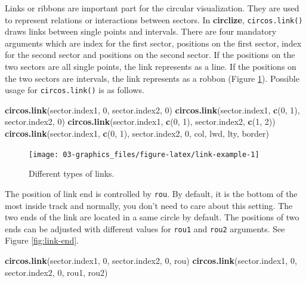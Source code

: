 \documentclass[]{book}
\newenvironment{Shaded}{\begin{snugshade}}{\end{snugshade}}
\newcommand{\KeywordTok}[1]{\textcolor[rgb]{0.13,0.29,0.53}{\textbf{#1}}}
\newcommand{\DecValTok}[1]{\textcolor[rgb]{0.00,0.00,0.81}{#1}}
\newcommand{\NormalTok}[1]{#1}
\theoremstyle{definition}
\theoremstyle{definition}
\theoremstyle{remark}
\begin{document}
Links or ribbons are important part for the circular visualization. They
are used to represent relations or interactions between sectors. In
\textbf{circlize}, \texttt{circos.link()} draws links between single
points and intervals. There are four mandatory arguments which are index
for the first sector, positions on the first sector, index for the
second sector and positions on the second sector. If the positions on
the two sectors are all single points, the link represents as a line. If
the positions on the two sectors are intervals, the link represents as a
robbon (Figure \ref{fig:link-example}). Possible usage for
\texttt{circos.link()} is as follows.

\begin{Shaded}
\begin{Highlighting}[]
\KeywordTok{circos.link}\NormalTok{(sector.index1, }\DecValTok{0}\NormalTok{, sector.index2, }\DecValTok{0}\NormalTok{)}
\KeywordTok{circos.link}\NormalTok{(sector.index1, }\KeywordTok{c}\NormalTok{(}\DecValTok{0}\NormalTok{, }\DecValTok{1}\NormalTok{), sector.index2, }\DecValTok{0}\NormalTok{)}
\KeywordTok{circos.link}\NormalTok{(sector.index1, }\KeywordTok{c}\NormalTok{(}\DecValTok{0}\NormalTok{, }\DecValTok{1}\NormalTok{), sector.index2, }\KeywordTok{c}\NormalTok{(}\DecValTok{1}\NormalTok{, }\DecValTok{2}\NormalTok{))}
\KeywordTok{circos.link}\NormalTok{(sector.index1, }\KeywordTok{c}\NormalTok{(}\DecValTok{0}\NormalTok{, }\DecValTok{1}\NormalTok{), sector.index2, }\DecValTok{0}\NormalTok{, col, lwd, lty, border)}
\end{Highlighting}
\end{Shaded}

\begin{figure}

{\centering \texttt{[image: 03-graphics\_files/figure-latex/link-example-1]} 

}

\caption{Different types of links.}\label{fig:link-example}
\end{figure}

The position of link end is controlled by \texttt{rou}. By default, it
is the bottom of the most inside track and normally, you don't need to
care about this setting. The two ends of the link are located in a same
circle by default. The positions of two ends can be adjusted with
different values for \texttt{rou1} and \texttt{rou2} arguments. See
Figure \ref{fig:link-end}.

\begin{Shaded}
\begin{Highlighting}[]
\KeywordTok{circos.link}\NormalTok{(sector.index1, }\DecValTok{0}\NormalTok{, sector.index2, }\DecValTok{0}\NormalTok{, rou)}
\KeywordTok{circos.link}\NormalTok{(sector.index1, }\DecValTok{0}\NormalTok{, sector.index2, }\DecValTok{0}\NormalTok{, rou1, rou2)}
\end{Highlighting}
\end{Shaded}
\end{document}
